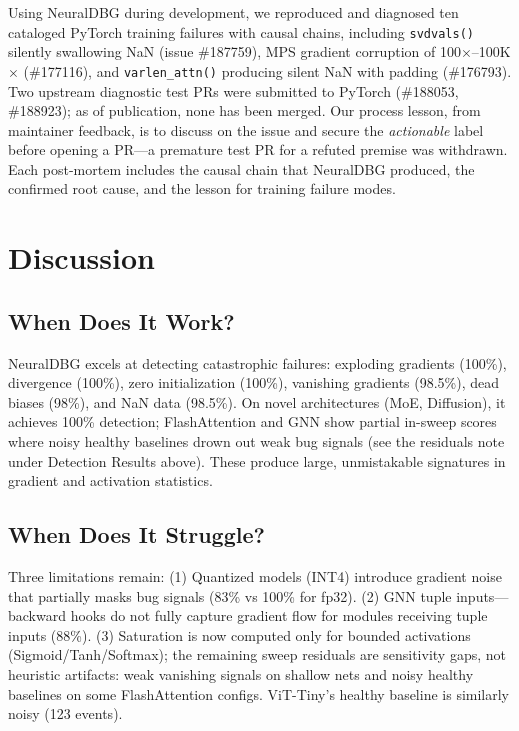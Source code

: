 \documentclass[11pt]{article}
\begin{document}
Using NeuralDBG during development, we reproduced and diagnosed ten cataloged PyTorch training failures with causal chains, including \texttt{svdvals()} silently swallowing NaN (issue \#187759), MPS gradient corruption of 100$\times$--100K$\times$ (\#177116), and \texttt{varlen\_attn()} producing silent NaN with padding (\#176793). Two upstream diagnostic test PRs were submitted to PyTorch (\#188053, \#188923); as of publication, none has been merged. Our process lesson, from maintainer feedback, is to discuss on the issue and secure the \emph{actionable} label before opening a PR---a premature test PR for a refuted premise was withdrawn. Each post-mortem includes the causal chain that NeuralDBG produced, the confirmed root cause, and the lesson for training failure modes.


\section{Discussion}

\subsection{When Does It Work?}

NeuralDBG excels at detecting catastrophic failures: exploding gradients (100\%), divergence (100\%), zero initialization (100\%), vanishing gradients (98.5\%), dead biases (98\%), and NaN data (98.5\%). On novel architectures (MoE, Diffusion), it achieves 100\% detection; FlashAttention and GNN show partial in-sweep scores where noisy healthy baselines drown out weak bug signals (see the residuals note under Detection Results above). These produce large, unmistakable signatures in gradient and activation statistics.

\subsection{When Does It Struggle?}

Three limitations remain: (1) Quantized models (INT4) introduce gradient noise that partially masks bug signals (83\% vs 100\% for fp32). (2) GNN tuple inputs---backward hooks do not fully capture gradient flow for modules receiving tuple inputs (88\%). (3) Saturation is now computed only for bounded activations (Sigmoid/Tanh/Softmax); the remaining sweep residuals are sensitivity gaps, not heuristic artifacts: weak vanishing signals on shallow nets and noisy healthy baselines on some FlashAttention configs. ViT-Tiny's healthy baseline is similarly noisy (123 events).
\end{document}
